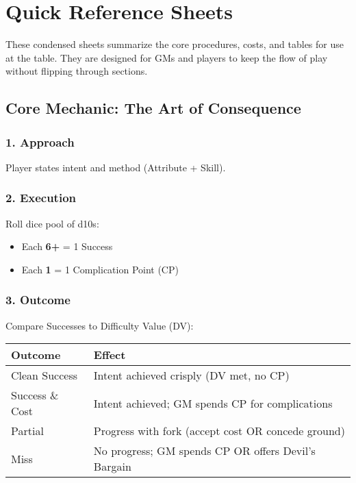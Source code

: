 
\chapter{Quick Reference Sheets}
\label{app:quickref}

These condensed sheets summarize the core procedures, costs, and tables for use at the table. They are designed for GMs and players to keep the flow of play without flipping through sections.

\section{Core Mechanic: The Art of Consequence}

\subsection*{1. Approach}
Player states intent and method (Attribute + Skill).

\subsection*{2. Execution}
Roll dice pool of d10s:
\begin{itemize}
  \item Each \textbf{6+} = 1 Success
  \item Each \textbf{1} = 1 Complication Point (CP) 
\end{itemize}

\subsection*{3. Outcome}
Compare Successes to Difficulty Value (DV):

\begin{center}
\begin{tabular}{ll}
\toprule
\textbf{Outcome} & \textbf{Effect} \\
\midrule
Clean Success & Intent achieved crisply (DV met, no CP) \\
Success \& Cost & Intent achieved; GM spends CP for complications \\
Partial & Progress with fork (accept cost OR concede ground) \\
Miss & No progress; GM spends CP OR offers Devil's Bargain \\
\bottomrule
\end{tabular}
\end{center}

